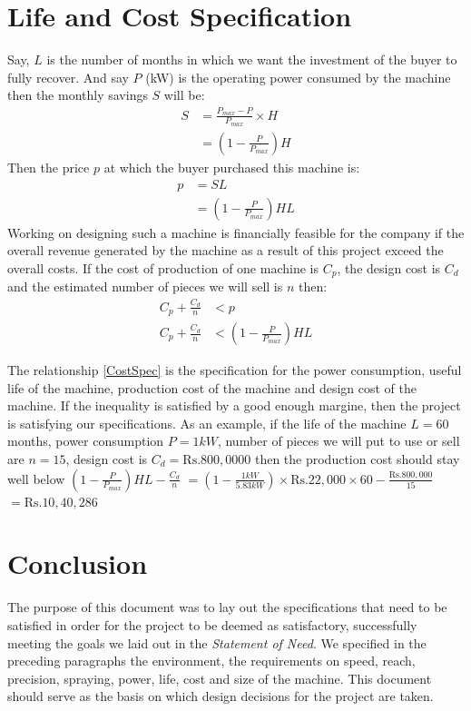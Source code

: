 \documentclass[a4paper,10pt]{article}
\begin{document}
\section{Life and Cost Specification}
Say, $L$ is the number of months in which we want the investment of the buyer to fully recover. And say $P$ (kW) is the operating power consumed by the machine then
the monthly savings $S$ will be:
\begin{align}
 S &= \frac{P_{max}-P}{P_{max}} \times H \nonumber \\
 &= \left(1-\frac{P}{P_{max}}\right)H 
\end{align}
Then the price $p$ at which the buyer purchased this machine is:
\begin{align}
 p &= SL \nonumber \\
 &= \left(1-\frac{P}{P_{max}}\right)HL 
\end{align}
Working on designing such a machine is financially feasible for the company if the overall revenue generated by the machine as a result of this 
project exceed the overall costs. If the cost of production of one machine is $C_p$, the design cost is $C_d$ and the estimated number of pieces 
we will sell is $n$ then:
\begin{align}
 C_p + \frac{C_d}{n} &< p \nonumber \\
 C_p + \frac{C_d}{n} &< \left(1-\frac{P}{P_{max}}\right)HL \label{CostSpec}
\end{align}

The relationship \ref{CostSpec} is the specification for the power consumption, useful life of the machine, production cost of the machine
and design cost of the machine. If the inequality is satisfied by a good enough margine, then the project is satisfying our specifications.
As an example, if the life of the machine $L=60$ months, power consumption $P=1kW$, number of pieces we will put to use or sell are $n=15$,
design cost is $C_d = \text{Rs.}800,0000$ then the production cost should stay well below $\left(1-\frac{P}{P_{max}}\right)HL-\frac{C_d}{n}$
$=\left(1-\frac{1kW}{5.83kW}\right) \times \text{Rs.}22,000 \times 60-\frac{\text{Rs.}800,000}{15}$ $=\text{Rs.}10,40,286$

\section{Conclusion}
The purpose of this document was to lay out the specifications that need to be satisfied in order for the project to be deemed as
satisfactory, successfully meeting the goals we laid out in the \emph{Statement of Need}. We specified in the preceding paragraphs the
environment, the requirements on speed, reach, precision, spraying, power, life, cost and size of the machine. This 
document should serve as the basis on which design decisions for the project are taken.
\end{document}

